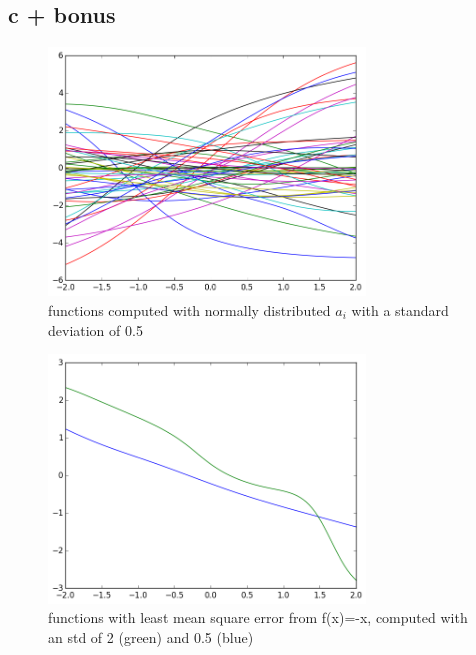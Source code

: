 \documentclass[11pt,a4paper]{article}
\begin{document}
\subsection*{c + bonus}
\begin{figure}[h]
\centering
 \includegraphics[width=0.75\textwidth]{./2_3_std=0_5.png}
\caption{functions computed with normally distributed $a_i$ with a standard deviation of 0.5}
\end{figure}
\begin{figure}[!h]
\centering
 \includegraphics[width=0.75\textwidth]{./2_3_star.png}
\caption{functions with least mean square error from f(x)=-x, computed with an std of 2 (green) and 0.5 (blue)}
\end{figure}
\end{document}
